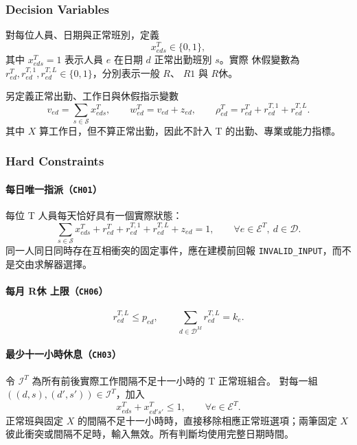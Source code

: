 \documentclass[12pt]{article}
\begin{document}
\subsubsection{Decision Variables}

對每位人員、日期與正常班別，定義
\[
  x^{T}_{eds}\in\{0,1\},
\]
其中 \(x^{T}_{eds}=1\) 表示人員 \(e\) 在日期 \(d\) 正常出勤班別 \(s\)。實際
休假變數為 \(r^{T}_{ed},r^{T,1}_{ed},r^{T,L}_{ed}\in\{0,1\}\)，分別表示一般 \(R\)、
\(R1\) 與 \(R休\)。

另定義正常出勤、工作日與休假指示變數
\[
  v_{ed}=\sum_{s\in\mathcal{S}}x^{T}_{eds},
  \qquad
  w^{T}_{ed}=v_{ed}+z_{ed},
  \qquad
  \rho^{T}_{ed}=r^{T}_{ed}+r^{T,1}_{ed}+r^{T,L}_{ed}.
\]
其中 \(X\) 算工作日，但不算正常出勤，因此不計入 T 的出勤、專業或能力指標。

\subsubsection{Hard Constraints}

\paragraph{每日唯一指派（\texttt{CH01}）}

每位 T 人員每天恰好具有一個實際狀態：
\[
  \sum_{s\in\mathcal{S}}x^{T}_{eds}
  +r^{T}_{ed}+r^{T,1}_{ed}+r^{T,L}_{ed}+z_{ed}=1,
  \qquad
  \forall e\in\mathcal{E}^{T},\ d\in\mathcal{D}.
\]
同一人同日同時存在互相衝突的固定事件，應在建模前回報
\texttt{INVALID\_INPUT}，而不是交由求解器選擇。

\paragraph{每月 R休 上限（\texttt{CH06}）}

\[
  r^{T,L}_{ed}\leq p_{ed},
  \qquad
  \sum_{d\in\mathcal D^M}r^{T,L}_{ed}=k_e.
\]

\paragraph{最少十一小時休息（\texttt{CH03}）}

令 \(\mathcal{I}^{T}\) 為所有前後實際工作間隔不足十一小時的 T 正常班組合。
對每一組 \(((d,s),(d',s'))\in\mathcal{I}^{T}\)，加入
\[
  x^{T}_{eds}+x^{T}_{ed's'}\leq 1,
  \qquad
  \forall e\in\mathcal{E}^{T}.
\]
正常班與固定 \(X\) 的間隔不足十一小時時，直接移除相應正常班選項；兩筆固定
\(X\) 彼此衝突或間隔不足時，輸入無效。所有判斷均使用完整日期時間。
\end{document}
